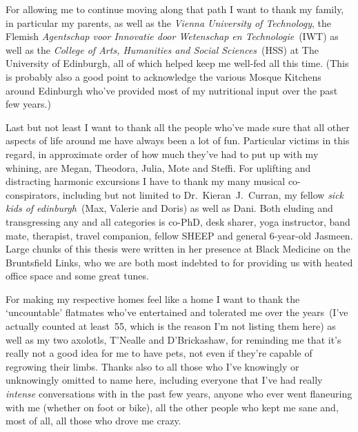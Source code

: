 \documentclass[twoside,10pt]{book}
\begin{document}
For allowing me to continue moving along that path I want to thank my family, in particular my parents, as well as the \emph{Vienna University of Technology}, the Flemish \emph{Agentschap voor Innovatie door Wetenschap en Technologie}~(IWT) as well as the \emph{College of Arts, Humanities and Social Sciences}~(HSS) at The University of Edinburgh, all of which helped keep me well-fed all this time. (This is probably also a good point to acknowledge the various Mosque Kitchens around Edinburgh who've provided most of my nutritional input over the past few years.)

Last but not least I want to thank all the people who've made sure that all other aspects of life around me have always been a lot of fun. Particular victims in this regard, in approximate order of how much they've had to put up with my whining, are Megan, Theodora, Julia, Mote and Steffi.
For uplifting and distracting harmonic excursions I have to thank my many musical co-conspirators, including but not limited to Dr.~Kieran~J.~Curran, my fellow \emph{sick kids of edinburgh}~(Max, Valerie and Doris) as well as Dani.
Both eluding and transgressing any and all categories is co-PhD, desk sharer, yoga instructor, band mate, therapist, travel companion, fellow SHEEP and general 6-year-old Jasmeen. Large chunks of this thesis were written in her presence at Black Medicine on the Bruntsfield Links, who we are both most indebted to for providing us with heated office space and some great tunes.

For making my respective homes feel like a home I want to thank the `uncountable' flatmates who've entertained and tolerated me over the years~(I've actually counted at least~55, which is the reason I'm not listing them here) as well as my two axolotls, T'Nealle and D'Brickashaw, for reminding me that it's really not a good idea for me to have pets, not even if they're capable of regrowing their limbs. %
Thanks also to all those who I've knowingly or unknowingly omitted to name here, including everyone that I've had really \emph{intense} conversations with in the past few years, anyone who ever went flaneuring with me (whether on foot or bike), all the other people who kept me sane and, most of all, all those who drove me crazy.
\end{document}
